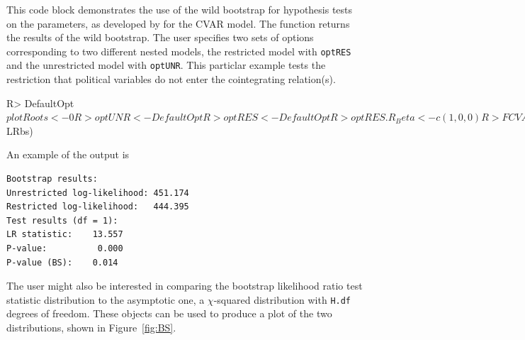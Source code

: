 \documentclass[article]{jss}
\newcommand{\fct}[1]{\code{#1()}}
\begin{document}
This code block
demonstrates the use of the wild bootstrap for hypothesis tests on the parameters, as developed by \cite{Boswijk2013} for the CVAR model. 
The function \fct{FCVARboot} returns the results of the wild bootstrap. 
The user specifies two sets of options corresponding to two different nested models, the restricted model with \verb|optRES| and the unrestricted model with \verb|optUNR|. 
This particlar example tests the restriction that political variables do not enter the cointegrating relation(s).



\begin{Code}
R> DefaultOpt$plotRoots <- 0
R> optUNR <- DefaultOpt
R> optRES <- DefaultOpt
R> optRES.R_Beta <- c(1, 0, 0)
R> FCVARboot_out <- FCVARboot(x1, k, r, optRES, optUNR, B = 999)
R> LRbs_density <- ksdensity(FCVARboot_out$LRbs)
\end{Code}

%

An example of the output is
\begin{verbatim}
Bootstrap results:
Unrestricted log-likelihood: 451.174
Restricted log-likelihood:   444.395
Test results (df = 1):
LR statistic: 	 13.557
P-value: 	      0.000
P-value (BS): 	 0.014
\end{verbatim}

The user might also be interested in comparing the bootstrap likelihood ratio test statistic distribution to the asymptotic one, a $\chi$-squared distribution with \verb|H.df| degrees of freedom. 
These objects can be used to produce 
a plot of the two distributions, shown in Figure~\ref{fig:BS}.
\end{document}
